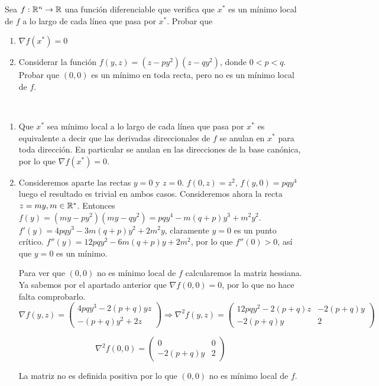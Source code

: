 \documentclass[twoside]{article}
\begin{document}
\begin{ejercicio}{3}
Sea $f:\mathbb{R}^n\to\mathbb{R}$ una función diferenciable que verifica que $x^*$ es un mínimo local de $f$ a lo largo de cada línea que pasa por $x^*$. Probar que 
\begin{enumerate}
\item $\nabla f(x^*)=0$
\item Considerar la función $f(y,z)=(z-py^2)(z-qy^2)$, donde $0<p<q$. Probar que $(0,0)$ es un mínimo en toda recta, pero no es un mínimo local de $f$.
\end{enumerate}

\begin{solucion}\
\begin{enumerate}
\item Que $x^*$ sea mínimo local a lo largo de cada línea que pasa por $x^*$ es equivalente a decir que las derivadas direccionales de $f$ se anulan en $x^*$ para toda dirección. En particular se anulan en las direcciones de la base canónica, por lo que $\nabla f(x^*)=0$. 
\item Consideremos aparte las rectas $y=0$ y $z=0$. $f(0,z)=z^2$, $f(y,0)=pqy^4$ luego el resultado es trivial en ambos casos. Consideremos ahora la recta $z=my, m\in\mathbb{R}^*$. Entonces $f(y)=(my-py^2)(my-qy^2)= pqy^4-m(q+p)y^3 +m^2y^2$. $f'(y)=4pqy^3-3m(q+p)y^2+2m^2y$, claramente $y=0$ es un punto crítico. $f''(y)=12pqy^2-6m(q+p)y+2m^2$, por lo que $f''(0)>0$, así que $y=0$ es un mínimo. 

Para ver que $(0,0)$ no es mínimo local de $f$ calcularemos la matriz hessiana. Ya sabemos por el apartado anterior que $\nabla f(0,0)=0$, por lo que no hace falta comprobarlo. $\nabla f(y,z)=\begin{pmatrix}
4pqy^3-2(p+q)yz\\
-(p+q)y^2+2z
\end{pmatrix}\Rightarrow\nabla^2 f(y,z)=\begin{pmatrix}
12pqy^2-2(p+q)z & -2(p+q)y\\
-2(p+q)y & 2
\end{pmatrix}$

$$\nabla^2 f(0,0)=\begin{pmatrix}
0 & 0\\
-2(p+q)y & 2
\end{pmatrix}$$

La matriz no es definida positiva por lo que $(0,0)$ no es mínimo local de $f$.
\end{enumerate}
\end{solucion}
\end{ejercicio}
\end{document}
